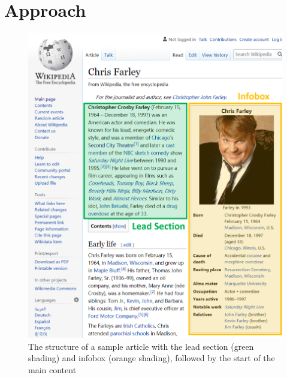 \section{Approach} \label{sec_approach}

\begin{figure}[t]
\centering
\includegraphics[width=1\columnwidth]{vis_example1}
\caption{The structure of a sample article with the lead section (green shading) and infobox (orange shading), followed by the start of the main content}
\label{vis_example1}
\end{figure}


